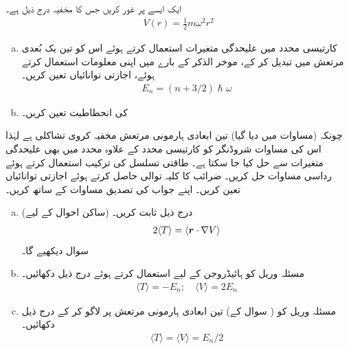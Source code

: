 ایک ایسے  پر غور کریں جس کا مخفیہ درج ذیل ہے۔ 
\begin{align}\label{مساوات_تین_ابعادی_ہارمونی_مخفیہ}
V(r) = \frac{1}{2} m \omega^2 r^2
\end{align}
\begin{enumerate}[a.]
\item
کارتیسی محدد میں علیحدگی متغیرات استعمال کرتے ہوئے اس کو تین یک بُعدی مرتعش میں تبدیل کر کے، موخر الذکر کے بارے میں اپنی معلومات استعمال کرتے ہوئے، اجازتی توانائیاں تعین کریں۔  
\begin{align}\label{مساوات_تین_ابعادی_ہارمونی_اجازتی}
E_n = (n + 3/2) \hslash \omega
\end{align}
\item
{} کی انحطاطیت  تعین کریں۔
\end{enumerate}
چونکہ (مساوات  میں دیا گیا) تین ابعادی ہارمونی مرتعش مخفیہ کروی تشاکلی ہے لہٰذا اس کی مساوات شروڈنگر کو کارتیسی محدد کے علاوہ  محدد میں بھی علیحدگی متغیرات سے حل کیا جا سکتا ہے۔ طاقتی تسلسل کی ترکیب استعمال کرتے ہوئے رداسی مساوات حل کریں۔ ضرائب کا کلیہ توالی حاصل کرتے ہوئے اجازتی توانائیاں تعین کریں۔ اپنے جواب کی تصدیق مساوات  کے ساتھ کریں۔
\begin{enumerate}[a.]
\item
(ساکن احوال کے لیے) درج ذیل  ثابت کریں۔
\begin{align}
2 \langle T \rangle = \langle {\ensuremath{{\boldsymbol{r}}}} \cdot \nabla V \rangle
\end{align}
 سوال  دیکھیے گا۔ 
\item
مسئلہ وریل کو ہائیڈروجن کے لیے استعمال کرتے ہوئے درج ذیل دکھائیں۔ 
\begin{align}\label{مساوات_تین_ابعادی_مسئلہ_وریل}
\langle T \rangle = - E_n; \quad \langle V \rangle = 2 E_n
\end{align}
\item
مسئلہ وریل کو ( سوال  کے) تین ابعادی ہارمونی مرتعش پر لاگو کر کے درج ذیل دکھائیں۔ 
\begin{align}
\langle T \rangle = \langle V \rangle = E_n /2
\end{align}
\end{enumerate}
